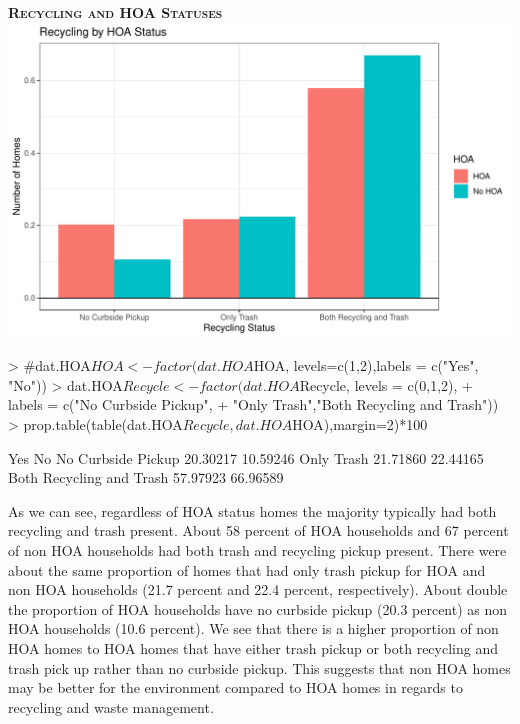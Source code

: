 \documentclass{article}
\begin{document}
\newpage
\textsc{\textbf{Recycling and HOA Statuses}}
\newline
\newline
\includegraphics{exam22-009}

\begin{Schunk}
\begin{Sinput}
> #dat.HOA$HOA<-factor(dat.HOA$HOA, levels=c(1,2),labels = c("Yes", "No"))
> dat.HOA$Recycle<-factor(dat.HOA$Recycle, levels = c(0,1,2),
+                         labels = c("No Curbside Pickup",
+                         "Only Trash","Both Recycling and Trash"))
> prop.table(table(dat.HOA$Recycle, dat.HOA$HOA),margin=2)*100
\end{Sinput}
\begin{Soutput}
                                Yes       No
  No Curbside Pickup       20.30217 10.59246
  Only Trash               21.71860 22.44165
  Both Recycling and Trash 57.97923 66.96589
\end{Soutput}
\end{Schunk}

As we can see, regardless of HOA status homes the majority typically had both recycling and trash present. About 58 percent of HOA households and 67 percent of non HOA households had both trash and recycling pickup present. There were about the same proportion of homes that had only trash pickup for HOA and non HOA households (21.7 percent and 22.4 percent, respectively). About double the proportion of HOA households have no curbside pickup (20.3 percent) as non HOA households (10.6 percent). We see that there is a higher proportion of non HOA homes to HOA homes that have either trash pickup or both recycling and trash pick up rather than no curbside pickup. This suggests that non HOA homes may be better for the environment compared to HOA homes in regards to recycling and waste management.
\end{document}
